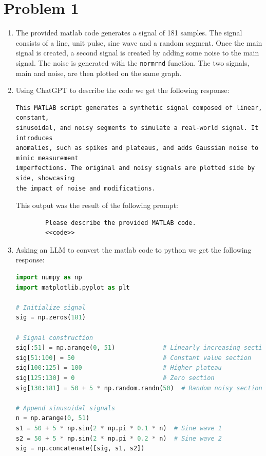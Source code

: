 \documentclass{article}
\begin{document}
\section{Problem 1}
\begin{enumerate}[label=\alph*.]
    \item The provided matlab code generates a signal of 181 samples. The signal consists of a line, unit pulse, sine wave and a random segment. Once the main signal is created, a second signal is created by adding some noise to the main signal. The noise is generated with the \texttt{normrnd} function. The two signals, main and noise, are then plotted on the same graph.

    \item Using ChatGPT to describe the code we get the following response:
    \begin{verbatim}
This MATLAB script generates a synthetic signal composed of linear, constant, 
sinusoidal, and noisy segments to simulate a real-world signal. It introduces 
anomalies, such as spikes and plateaus, and adds Gaussian noise to mimic measurement 
imperfections. The original and noisy signals are plotted side by side, showcasing 
the impact of noise and modifications.
    \end{verbatim}
    This output was the result of the following prompt:
    \begin{verbatim}
        Please describe the provided MATLAB code.
        <<code>>
    \end{verbatim}

    \item Asking an LLM to convert the matlab code to python we get the following response:

    \begin{lstlisting}[language=Python, label={code:p1}, caption={Python code generated by LLM}]
import numpy as np
import matplotlib.pyplot as plt

# Initialize signal
sig = np.zeros(181)

# Signal construction
sig[:51] = np.arange(0, 51)             # Linearly increasing section
sig[51:100] = 50                        # Constant value section
sig[100:125] = 100                      # Higher plateau
sig[125:130] = 0                        # Zero section
sig[130:181] = 50 + 5 * np.random.randn(50)  # Random noisy section

# Append sinusoidal signals
n = np.arange(0, 51)
s1 = 50 + 5 * np.sin(2 * np.pi * 0.1 * n)  # Sine wave 1
s2 = 50 + 5 * np.sin(2 * np.pi * 0.2 * n)  # Sine wave 2
sig = np.concatenate([sig, s1, s2])


\end{lstlisting}
\end{enumerate}
\end{document}
